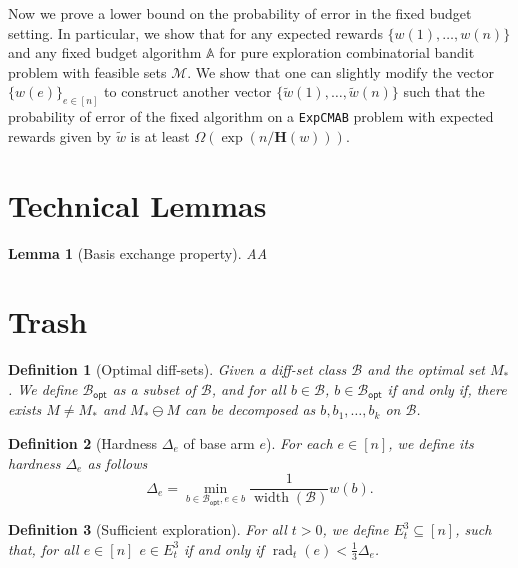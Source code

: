 \documentclass{article}
\newtheorem{define}{Definition}
\newtheorem{lemma}{Lemma}
\newcommand{\Problem}{\texttt{ExpCMAB}\xspace}
\newcommand{\M}{\mathcal M}
\newcommand{\B}{\mathcal B}
\newcommand{\Bopt}{\mathcal B_{\mathsf{opt}}}
\DeclareMathOperator{\rank}{width}
\DeclareMathOperator{\rad}{rad}
\begin{document}
\begin{spacing}{1.1}
Now we prove a lower bound on the probability of error in the fixed budget setting.
In particular, we show that for any expected rewards $\{w(1),\ldots, w(n)\}$ and any fixed budget algorithm $\mathbb A$ for pure exploration combinatorial bandit problem with feasible sets $\M$. 
We show that one can slightly modify the vector $\{w(e)\}_{e\in [n]}$ to construct another vector $\{\tilde w(1),\ldots,\tilde w(n)\}$ such that the probability of error of the fixed algorithm on a \Problem problem with expected rewards given by $\tilde w$ is at least $\Omega(\exp(n/\mathbf H(w)))$.



\section{Technical Lemmas}


\begin{lemma}[Basis exchange property]
AA
\label{lemma:basis-exchange-matroid}
\end{lemma}


\section{Trash}




\begin{define}[Optimal diff-sets]
Given a diff-set class $\B$ and the optimal set $M_*$.
We define $\Bopt$ as a subset of $\B$, and for all $b\in \B$, $b\in \Bopt$ if and only if,
there exists $M\not=M_*$ and $M_* \ominus M$ can be decomposed as $b,b_1,\ldots,b_k$ on $\B$.
\end{define}

\begin{define}[Hardness $\Delta_e$ of base arm $e$]
For each $e\in [n]$, we define its hardness $\Delta_e$ as follows
$$
\Delta_e = \min_{b\in \Bopt, e\in b} \frac{1}{\rank(\B)} w(b).
$$
\end{define}

\begin{define}[Sufficient exploration]
For all $t>0$, we define $E_t^3 \subseteq [n]$, such that, for all $e\in[n]$
$e\in E_t^3$ if and only if $\rad_t(e) < \frac{1}{3} \Delta_e$.
\end{define}


\end{spacing}
\end{document}
